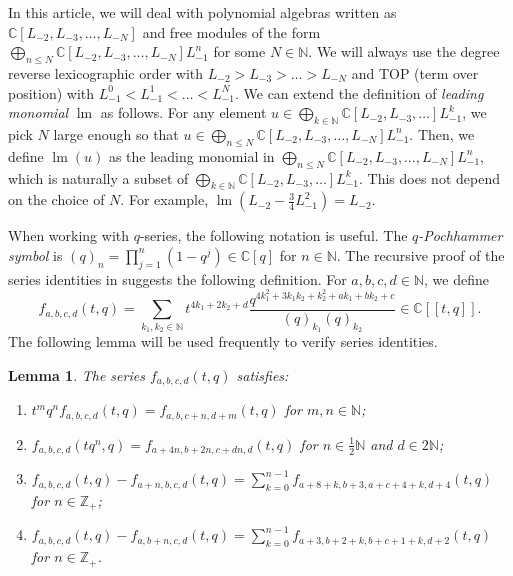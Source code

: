\documentclass[a4paper, 12pt, reqno]{amsart}
\newtheorem{lemma}[theorem]{Lemma}
\theoremstyle{remark}
\DeclareMathOperator{\lm}{lm}
\begin{document}
In this article, we will deal with polynomial algebras written as $\mathbb{C}[L_{-2}, L_{-3}, \dots, L_{-N}]$ and free modules of the form $\bigoplus_{n \le N}\mathbb{C}[L_{-2}, L_{-3}, \dots, L_{-N}]L_{-1}^n$ for some $N \in \mathbb{N}$.
We will always use the degree reverse lexicographic order with $L_{-2} > L_{-3} > \dots > L_{-N}$ and TOP (term over position) with $L_{-1}^0 < L_{-1}^1 < \dots < L_{-1}^N$.
We can extend the definition of \emph{leading monomial} $\lm$ as follows.
For any element $u \in \bigoplus_{k \in \mathbb{N}}\mathbb{C}[L_{-2}, L_{-3}, \dots]L_{-1}^k$, we pick $N$ large enough so that $u \in \bigoplus_{n \le N}\mathbb{C}[L_{-2}, L_{-3}, \dots, L_{-N}]L_{-1}^n$.
Then, we define $\lm(u)$ as the leading monomial in $\bigoplus_{n \le N}\mathbb{C}[L_{-2}, L_{-3}, \dots, L_{-N}]L_{-1}^n$, which is naturally a subset of $\bigoplus_{k \in \mathbb{N}}\mathbb{C}[L_{-2}, L_{-3}, \dots]L_{-1}^k$.
This does not depend on the choice of $N$.
For example, $\lm(L_{-2} - \frac{3}{4}L_{-1}^2) = L_{-2}$.

When working with $q$-series, the following notation is useful.
The \emph{$q$-Pochhammer symbol} is $(q)_n = \prod_{j = 1}^n(1 - q^j) \in \mathbb{C}[q]$ for $n \in \mathbb{N}$.
The recursive proof of the series identities in \cite{andrews_singular_2022} suggests the following definition.
For $a, b, c, d \in \mathbb{N}$, we define
\begin{equation*}
  f_{a, b, c, d}(t, q) = \sum_{k_1, k_2 \in \mathbb{N}}t^{4k_1 + 2k_2 + d}\frac{q^{4k_1^2 + 3k_1k_2 + k_2^2 + ak_1 + bk_2 + c}}{(q)_{k_1}(q)_{k_2}} \in \mathbb{C}[[t, q]].
\end{equation*}
The following lemma will be used frequently to verify series identities.

\begin{lemma}
  \label{lmm:1}
  The series $f_{a, b, c, d}(t, q)$ satisfies:
  \begin{enumerate}
  \item $t^mq^nf_{a, b, c, d}(t, q) = f_{a, b, c + n, d + m}(t, q)$ for $m, n \in \mathbb{N}$;
  \item $f_{a, b, c, d}(tq^n, q) = f_{a + 4n, b + 2n, c + dn, d}(t, q)$ for $n \in \frac{1}{2}\mathbb{N}$ and $d \in 2\mathbb{N}$;
  \item $f_{a, b, c, d}(t, q) - f_{a + n, b, c, d}(t, q) = \sum_{k = 0}^{n - 1}f_{a + 8 + k, b + 3, a + c + 4 + k, d + 4}(t, q)$ for $n \in \mathbb{Z}_+$;
  \item $f_{a, b, c, d}(t, q) - f_{a, b + n, c, d}(t, q) = \sum_{k = 0}^{n - 1}f_{a + 3, b + 2 + k, b + c + 1 + k, d + 2}(t, q)$ for $n \in \mathbb{Z}_+$.
  \end{enumerate}
\end{lemma}
\end{document}
